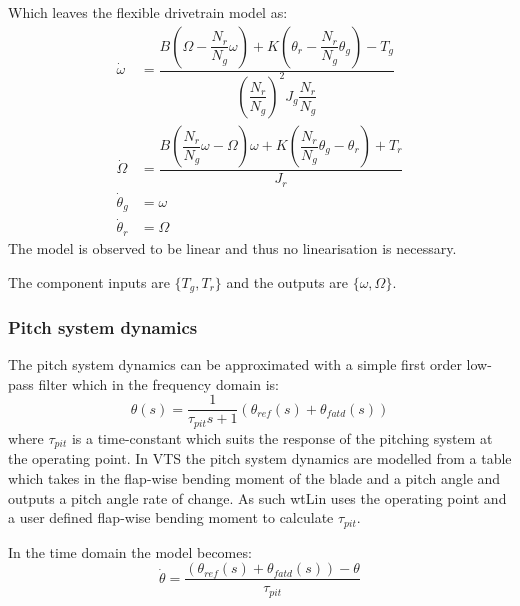 Which leaves the flexible drivetrain model as:
\begin{align} 
	\dot{\omega} & = \dfrac{B \left(\Omega - \dfrac{N_r}{N_g}\omega\right) + K\left(\theta_r - \dfrac{N_r}{N_g} \theta_{g}\right) - T_{g}}{\left(\dfrac{N_r}{N_g}\right)^2 J_{g} \dfrac{N_r}{N_g} } \label{eq:comp_comp_drivetrain_flex_mod_1} \\
	\dot{\Omega} & = \dfrac{B \left(\dfrac{N_r}{N_g}\omega - \Omega \right) \omega + K\left(\dfrac{N_r}{N_g} \theta_{g} - \theta_r\right) + T_{r}}{J_{r}} \label{eq:comp_comp_drivetrain_flex_mod_2} \\
		\dot{\theta}_g & = \omega \\
		\dot{\theta}_r & = \Omega
\end{align}
The model is observed to be linear and thus no linearisation is necessary.

The component inputs are $ \{T_g, T_r\} $ and the outputs are $ \{\omega, \Omega\} $. 

\subsubsection{Pitch system dynamics} \label{sec:comp_pitch_dyn}
The pitch system dynamics can be approximated with a simple first order low-pass filter which in the frequency domain is:
\begin{equation}\label{eq:comp_pitch_freq_dyn}
	\theta(s) = \dfrac{1}{\tau_{pit} s + 1} (\theta_{ref}(s) + \theta_{fatd}(s))
\end{equation}
where $ \tau_{pit} $ is a time-constant which suits the response of the pitching system at the operating point. In VTS the pitch system dynamics are modelled from a table which takes in the flap-wise bending moment of the blade and a pitch angle and outputs a pitch angle rate of change. As such wtLin uses the operating point and a user defined flap-wise bending moment to calculate $ \tau_{pit} $.

In the time domain the model becomes:
\begin{equation}\label{eq:comp_pitch_time}
	\dot{\theta} =\dfrac{(\theta_{ref}(s) + \theta_{fatd}(s)) - \theta}{\tau_{pit}}
\end{equation}

